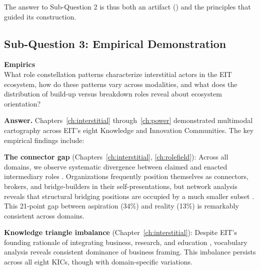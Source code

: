 \documentclass[../main.tex]{subfiles}
\begin{document}
The answer to Sub-Question 2 is thus both an artifact (\RoleBox{}) and the principles that guided its construction.

\subsection{Sub-Question 3: Empirical Demonstration}

\begin{subrq}
\textbf{Empirics}\\
What role constellation patterns characterize interstitial actors in the EIT ecosystem, how do these patterns vary across modalities, and what does the distribution of build-up versus breakdown roles reveal about ecosystem orientation?
\end{subrq}

\noindent\textbf{Answer.} Chapters~\ref{ch:interstitial} through~\ref{ch:power} demonstrated multimodal cartography across EIT's eight Knowledge and Innovation Communities. The key empirical findings include:

\textbf{The connector gap} (Chapters~\ref{ch:interstitial}, \ref{ch:rolefield}): Across all domains, we observe systematic divergence between claimed and enacted intermediary roles \cite{kivimaa2019innovation,howells2006intermediation}. Organizations frequently position themselves as connectors, brokers, and bridge-builders in their self-presentations, but network analysis reveals that structural bridging positions are occupied by a much smaller subset \cite{burt1992structural}. This 21-point gap between aspiration (34\%) and reality (13\%) is remarkably consistent across domains.

\textbf{Knowledge triangle imbalance} (Chapter~\ref{ch:interstitial}): Despite EIT's founding rationale of integrating business, research, and education \cite{etzkowitz2000dynamics,carayannis2009mode}, vocabulary analysis reveals consistent dominance of business framing. This imbalance persists across all eight KICs, though with domain-specific variations.
\end{document}
